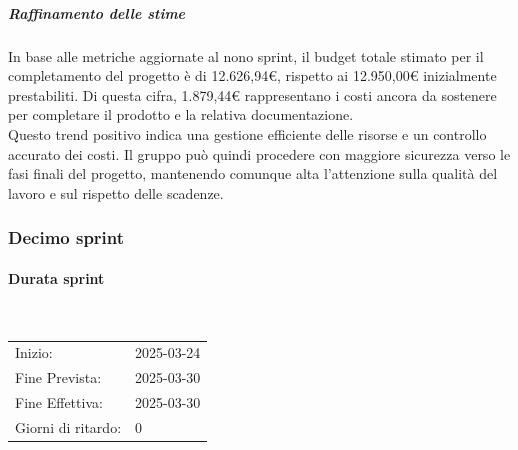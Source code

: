 \documentclass[10pt]{article}
\begin{document}
{{{{{{{{{{        \subparagraph{Raffinamento delle stime}\mbox{}\vspace{0.4em}

        In base alle metriche aggiornate al nono sprint, il budget totale stimato per il completamento del progetto è di 12.626,94€, rispetto ai 12.950,00€ inizialmente prestabiliti.
        Di questa cifra, 1.879,44€ rappresentano i costi ancora da sostenere per completare il prodotto e la relativa documentazione.\\
        Questo trend positivo indica una gestione efficiente delle risorse e un controllo accurato dei costi. Il gruppo può quindi procedere con maggiore sicurezza verso le fasi finali del progetto, mantenendo comunque alta l'attenzione sulla qualità del lavoro e sul rispetto delle scadenze.


    
        \newpage
        \subsubsection{Decimo sprint}
        \label{decimo-sprint$_G$}
    
        \paragraph{Durata sprint}\mbox{}\\
            \vspace{-1.5em}
            \begin{table}[h] 
            \renewcommand{\arraystretch}{1.2}  
            \begin{tabular}{ l l }
                Inizio: & 2025-03-24 \\
                Fine Prevista: & 2025-03-30 \\
                Fine Effettiva: & 2025-03-30 \\
                Giorni di ritardo: & 0 \\
            \end{tabular}
            \end{table}
            \vspace{-2em}
            {\renewcommand{\arraystretch}{1.5}%
            
}}}}}}}}}}}
\end{document}
